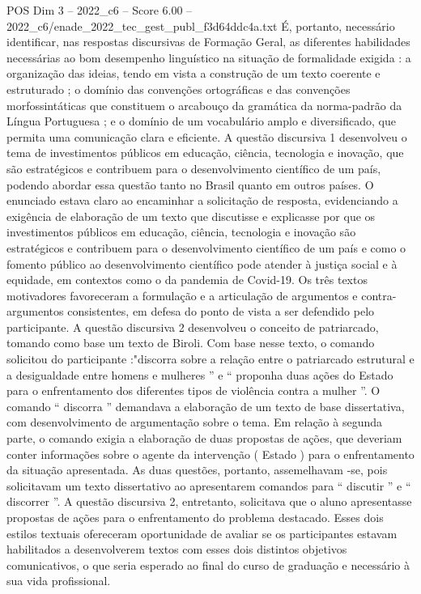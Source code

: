 \begin{textsample}{POS Dim 3 – 2022\_c6 – Score 6.00 – 2022\_c6/enade\_2022\_tec\_gest\_publ\_f3d64ddc4a.txt}
É, portanto, necessário identificar, nas respostas discursivas de Formação Geral, as diferentes habilidades necessárias ao bom desempenho linguístico na situação de formalidade exigida : a organização das ideias, tendo em vista a construção de um texto coerente e estruturado ; o domínio das convenções ortográficas e das convenções morfossintáticas que constituem o arcabouço da gramática da norma-padrão da Língua Portuguesa ; e o domínio de um vocabulário amplo e diversificado, que permita uma comunicação clara e eficiente.
A questão discursiva 1 desenvolveu o tema de investimentos públicos em educação, ciência, tecnologia e inovação, que são estratégicos e contribuem para o desenvolvimento científico de um país, podendo abordar essa questão tanto no Brasil quanto em outros países.
O enunciado estava claro ao encaminhar a solicitação de resposta, evidenciando a exigência de elaboração de um texto que discutisse e explicasse por que os investimentos públicos em educação, ciência, tecnologia e inovação são estratégicos e contribuem para o desenvolvimento científico de um país e como o fomento público ao desenvolvimento científico pode atender à justiça social e à equidade, em contextos como o da pandemia de Covid-19.
Os três textos motivadores favoreceram a formulação e a articulação de argumentos e contra-argumentos consistentes, em defesa do ponto de vista a ser defendido pelo participante.
A questão discursiva 2 desenvolveu o conceito de patriarcado, tomando como base um texto de Biroli.
Com base nesse texto, o comando solicitou do participante :"discorra sobre a relação entre o patriarcado estrutural e a desigualdade entre homens e mulheres ” e “ proponha duas ações do Estado para o enfrentamento dos diferentes tipos de violência contra a mulher ”.
O comando “ discorra ” demandava a elaboração de um texto de base dissertativa, com desenvolvimento de argumentação sobre o tema.
Em relação à segunda parte, o comando exigia a elaboração de duas propostas de ações, que deveriam conter informações sobre o agente da intervenção ( Estado ) para o enfrentamento da situação apresentada.
As duas questões, portanto, assemelhavam -se, pois solicitavam um texto dissertativo ao apresentarem comandos para “ discutir ” e “ discorrer ”.
A questão discursiva 2, entretanto, solicitava que o aluno apresentasse propostas de ações para o enfrentamento do problema destacado.
Esses dois estilos textuais ofereceram oportunidade de avaliar se os participantes estavam habilitados a desenvolverem textos com esses dois distintos objetivos comunicativos, o que seria esperado ao final do curso de graduação e necessário à sua vida profissional.

\end{textsample}
